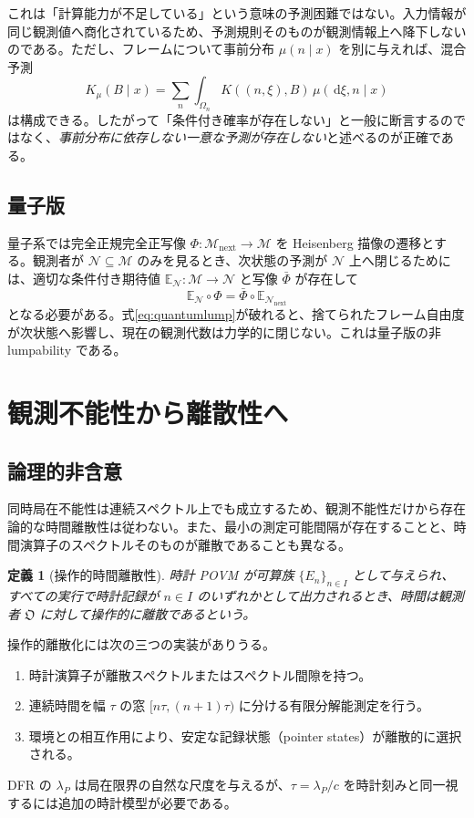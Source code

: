 \documentclass[a4paper,11pt]{ltjsarticle}
\newtheorem{definition}{定義}[section]
\theoremstyle{remark}
\newcommand{\M}{\mathcal{M}}
\newcommand{\N}{\mathcal{N}}
\newcommand{\dd}{\,\mathrm{d}}
\begin{document}
これは「計算能力が不足している」という意味の予測困難ではない。入力情報が同じ観測値へ商化されているため、予測規則そのものが観測情報上へ降下しないのである。ただし、フレームについて事前分布 $\mu(n\mid x)$ を別に与えれば、混合予測
\begin{equation}
 K_\mu(B\mid x)
 =\sum_n\int_{\Omega_n}K((n,\xi),B)\,\mu(\dd\xi,n\mid x)
\end{equation}
は構成できる。したがって「条件付き確率が存在しない」と一般に断言するのではなく、\emph{事前分布に依存しない一意な予測が存在しない}と述べるのが正確である。

\subsection{量子版}
量子系では完全正規完全正写像 $\Phi:\M_{\mathrm{next}}\to\M$ を Heisenberg 描像の遷移とする。観測者が $\N\subseteq\M$ のみを見るとき、次状態の予測が $\N$ 上へ閉じるためには、適切な条件付き期待値 $\mathbb E_\N:\M\to\N$ と写像 $\bar\Phi$ が存在して
\begin{equation}
 \mathbb E_\N\circ\Phi
 =\bar\Phi\circ\mathbb E_{\N_{\mathrm{next}}}
 \label{eq:quantumlump}
\end{equation}
となる必要がある。式\eqref{eq:quantumlump}が破れると、捨てられたフレーム自由度が次状態へ影響し、現在の観測代数は力学的に閉じない。これは量子版の非 lumpability である。

\section{観測不能性から離散性へ}

\subsection{論理的非含意}
同時局在不能性は連続スペクトル上でも成立するため、観測不能性だけから存在論的な時間離散性は従わない。また、最小の測定可能間隔が存在することと、時間演算子のスペクトルそのものが離散であることも異なる。

\begin{definition}[操作的時間離散性]
時計 POVM が可算族 $\{E_n\}_{n\in I}$ として与えられ、すべての実行で時計記録が $n\in I$ のいずれかとして出力されるとき、時間は観測者 $\mathfrak O$ に対して\emph{操作的に離散}であるという。
\end{definition}

操作的離散化には次の三つの実装がありうる。
\begin{enumerate}
  \item 時計演算子が離散スペクトルまたはスペクトル間隙を持つ。
  \item 連続時間を幅 $\tau$ の窓 $[n\tau,(n+1)\tau)$ に分ける有限分解能測定を行う。
  \item 環境との相互作用により、安定な記録状態（pointer states）が離散的に選択される。
\end{enumerate}
DFR の $\lambda_P$ は局在限界の自然な尺度を与えるが、$\tau=\lambda_P/c$ を時計刻みと同一視するには追加の時計模型が必要である。
\end{document}
